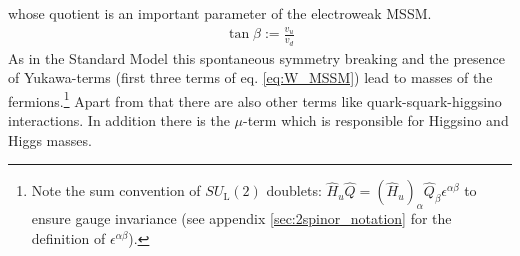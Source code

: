 whose quotient is an important parameter of the electroweak MSSM.
\begin{align}
\tan \beta := \frac{v_u}{v_d}
\end{align}
As in the Standard Model this spontaneous symmetry breaking and the presence of Yukawa-terms (first three terms of eq. \eqref{eq:W_MSSM}) lead to masses of the fermions.\footnote{Note the sum convention of $SU_{\mathrm{L}}(2)$ doublets: $\hat{H}_u \hat{Q} =  (\hat{H}_u)_{\alpha}\hat{Q}_\beta \epsilon^{\alpha\beta}$ to ensure gauge invariance (see appendix \ref{sec:2spinor_notation} for the definition of $\epsilon^{\alpha\beta}$).} Apart from that there are also other terms like quark-squark-higgsino interactions. In addition there is the $\mu$-term which is responsible for Higgsino and Higgs masses.\\


